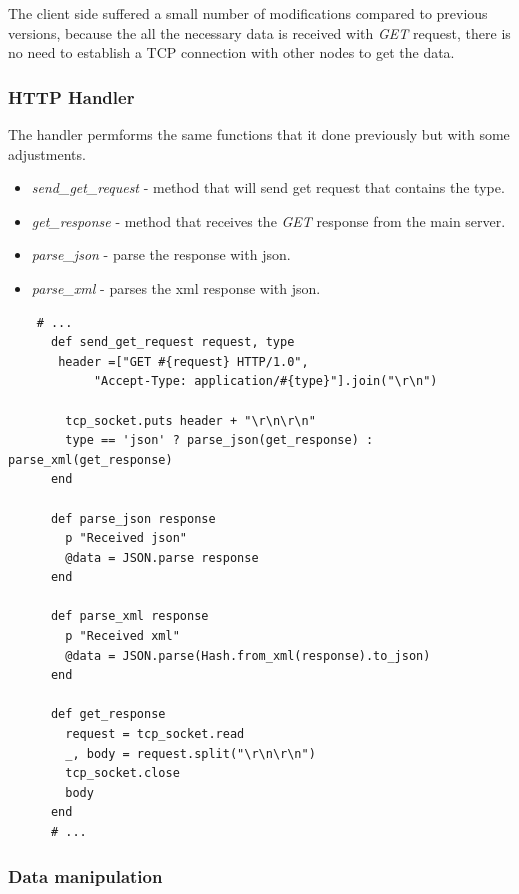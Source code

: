 \documentclass[12pt]{article}
\begin{document}
    The client side suffered a small number of modifications compared to previous versions, 
    because the all the necessary data is received with \textit{GET} request, there is no need
    to establish a TCP connection with other nodes to get the data. 

    \subsubsection{HTTP Handler}

    The handler permforms the same functions that it done previously but with some adjustments.

    \begin{itemize}
      \renewcommand{\labelitemi}{$\circ$}
      \item \textit{send\_get\_request} - method that will send get request that contains the type.
      \item \textit{get\_response} - method that receives the \textit{GET} response from the main server.
      \item \textit{parse\_json} - parse the response with json.
      \item \textit{parse\_xml} - parses the xml response with json.
    \end{itemize}

    \begin{lstlisting}
    # ... 
      def send_get_request request, type
       header =["GET #{request} HTTP/1.0",
            "Accept-Type: application/#{type}"].join("\r\n")

        tcp_socket.puts header + "\r\n\r\n"    
        type == 'json' ? parse_json(get_response) : parse_xml(get_response)
      end

      def parse_json response
        p "Received json"
        @data = JSON.parse response
      end
      
      def parse_xml response
        p "Received xml"
        @data = JSON.parse(Hash.from_xml(response).to_json)
      end

      def get_response
        request = tcp_socket.read
        _, body = request.split("\r\n\r\n")
        tcp_socket.close
        body
      end
      # ...
    \end{lstlisting}

    \subsubsection{Data manipulation}
\end{document}
